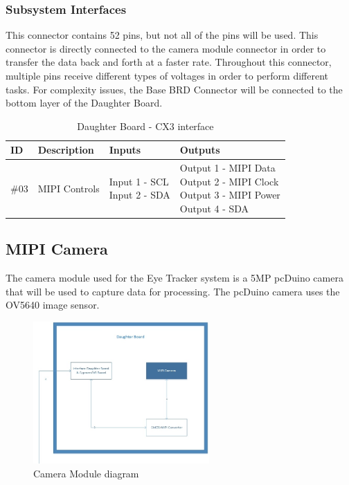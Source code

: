 \subsubsection{Subsystem Interfaces}
This connector contains 52 pins, but not all of the pins will be used. This connector is directly connected to the camera module connector in order to transfer the data back and forth at a faster rate.  Throughout this connector, multiple pins receive different types of voltages in order to perform different tasks. For complexity issues, the Base BRD Connector will be connected to the bottom layer of the Daughter Board.

\begin {table}[H]
\caption {Daughter Board - CX3 interface}
\begin{center}
    \begin{tabular}{ | p{1cm} | p{6cm} | p{3cm} | p{3cm} |}
    \hline
    ID & Description & Inputs & Outputs \\ \hline
     \#03 & MIPI Controls & \pbox{3cm}{Input 1 - SCL \\ Input 2 - SDA} & \pbox{3cm}{Output 1 - MIPI Data \\ Output 2 - MIPI Clock \\ Output 3 - MIPI Power \\ Output 4 - SDA}  \\ \hline
    \end{tabular}
\end{center}
\end{table}

\subsection{MIPI Camera}
The camera module used for the Eye Tracker system is a 5MP pcDuino camera that will be used to capture data for processing. The pcDuino camera uses the OV5640 image sensor.

\begin{figure}[h!]
	\centering
 	\includegraphics[width=0.60\textwidth]{images/DaughterBoard_Camera}
 \caption{Camera Module diagram}
\end{figure}

